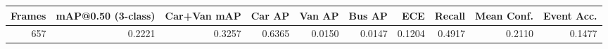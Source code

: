 \begin{tabular}{rrrrrrrrrr}
\toprule
Frames & mAP@0.50 (3-class) & Car+Van mAP & Car AP & Van AP & Bus AP & ECE & Recall & Mean Conf. & Event Acc. \\
\midrule
657 & 0.2221 & 0.3257 & 0.6365 & 0.0150 & 0.0147 & 0.1204 & 0.4917 & 0.2110 & 0.1477 \\
\bottomrule
\end{tabular}

